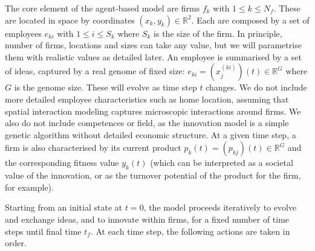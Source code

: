 \documentclass[letterpaper]{article}
\begin{document}
The core element of the agent-based model are firms $f_k$ with $1 \leq k \leq N_f$. These are located in space by coordinates $(x_k,y_k) \in \mathbb{R}^2$. Each are composed by a set of employees $e_{ki}$ with $1 \leq i \leq S_k$ where $S_k$ is the size of the firm. In principle, number of firms, locations and sizes can take any value, but we will parametrise them with realistic values as detailed later. An employee is summarised by a set of ideas, captured by a real genome of fixed size: $e_{ki} = (x^{(ki)}_j) (t) \in \mathbb{R}^G$ where $G$ is the genome size. These will evolve as time step $t$ changes. We do not include more detailed employee characteristics such as home location, assuming that spatial interaction modeling captures microscopic interactions around firms. We also do not include competences or field, as the innovation model is a simple genetic algorithm without detailed economic structure. At a given time step, a firm is also characterised by its current product $p_k (t) = (p_{kj})(t)\in \mathbb{R}^G$ and the corresponding fitness value $y_k (t)$ (which can be interpreted as a societal value of the innovation, or as the turnover potential of the product for the firm, for example).

Starting from an initial state at $t = 0$, the model proceeds iteratively to evolve and exchange ideas, and to innovate within firms, for a fixed number of time steps until final time $t_f$. At each time step, the following actions are taken in order.
\end{document}

